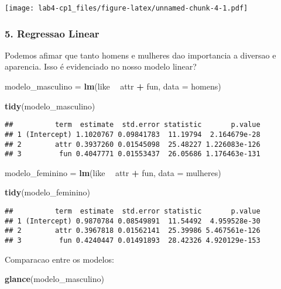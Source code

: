 \documentclass[]{article}
\newenvironment{Shaded}{\begin{snugshade}}{\end{snugshade}}
\newcommand{\KeywordTok}[1]{\textcolor[rgb]{0.13,0.29,0.53}{\textbf{#1}}}
\newcommand{\DataTypeTok}[1]{\textcolor[rgb]{0.13,0.29,0.53}{#1}}
\newcommand{\StringTok}[1]{\textcolor[rgb]{0.31,0.60,0.02}{#1}}
\newcommand{\OperatorTok}[1]{\textcolor[rgb]{0.81,0.36,0.00}{\textbf{#1}}}
\newcommand{\NormalTok}[1]{#1}
\begin{document}
\texttt{[image: lab4-cp1\_files/figure-latex/unnamed-chunk-4-1.pdf]}

\subsubsection{5. Regressao Linear}\label{regressao-linear}

Podemos afimar que tanto homens e mulheres dao importancia a diversao e
aparencia. Isso é evidenciado no nosso modelo linear?

\begin{Shaded}
\begin{Highlighting}[]
\NormalTok{modelo_masculino =}\StringTok{ }\KeywordTok{lm}\NormalTok{(like }\OperatorTok{~}\StringTok{ }\NormalTok{attr }\OperatorTok{+}\StringTok{ }\NormalTok{fun, }
               \DataTypeTok{data =}\NormalTok{ homens)}

\KeywordTok{tidy}\NormalTok{(modelo_masculino)}
\end{Highlighting}
\end{Shaded}

\begin{verbatim}
##          term  estimate  std.error statistic       p.value
## 1 (Intercept) 1.1020767 0.09841783  11.19794  2.164679e-28
## 2        attr 0.3937260 0.01545098  25.48227 1.226083e-126
## 3         fun 0.4047771 0.01553437  26.05686 1.176463e-131
\end{verbatim}

\begin{Shaded}
\begin{Highlighting}[]
\NormalTok{modelo_feminino =}\StringTok{ }\KeywordTok{lm}\NormalTok{(like }\OperatorTok{~}\StringTok{ }\NormalTok{attr }\OperatorTok{+}\StringTok{ }\NormalTok{fun, }
               \DataTypeTok{data =}\NormalTok{ mulheres)}

\KeywordTok{tidy}\NormalTok{(modelo_feminino)}
\end{Highlighting}
\end{Shaded}

\begin{verbatim}
##          term  estimate  std.error statistic       p.value
## 1 (Intercept) 0.9870784 0.08549891  11.54492  4.959528e-30
## 2        attr 0.3967818 0.01562141  25.39986 5.467561e-126
## 3         fun 0.4240447 0.01491893  28.42326 4.920129e-153
\end{verbatim}

Comparacao entre os modelos:

\begin{Shaded}
\begin{Highlighting}[]
\KeywordTok{glance}\NormalTok{(modelo_masculino)}
\end{Highlighting}
\end{Shaded}
\end{document}

